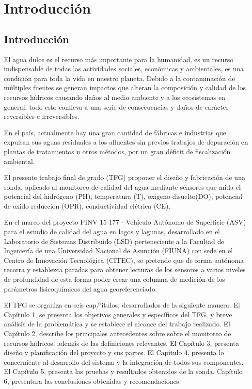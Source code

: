\chapter[Capítulo 1. Introducción]{Introducción}
\pagestyle{fancy}

\section{Introducción}

El agua dulce es el recurso más importante para la humanidad, es un recurso indispensable de todas las actividades sociales, económicas y ambientales, es una condición para toda la vida en nuestro planeta.
Debido a la contaminación de múltiples fuentes se generan impactos que alteran la composición y calidad de los recursos hídricos causando daños al medio ambiente y a los ecosistemas en general, todo esto conlleva a una serie de consecuencias y daños de carácter reversibles e irreversibles.

En el pa\'is, actualmente hay una gran cantidad de f\'abricas e industrias que expulsan sus aguas residuales a los afluentes sin previos trabajos de depuraci\'on en plantas de tratamientos u otros m\'etodos, por un gran d\'eficit de fiscalizaci\'on ambiental.

%
%
%
%

El presente trabajo final de grado (TFG) proponer el dise\~no y fabricación de una sonda, aplicado al monitoreo de calidad del agua mediante sensores que mida el potencial del hidr\'ogeno (PH), temperatura (T), oxigeno disuelto(DO), potencial de oxido reducci\'on (OPR), conductividad el\'ctrica (CE).
 
En el marco del proyecto  PINV 15-177 - Veh\'iculo Aut\'onomo de Superficie (ASV) para el estudio de calidad del agua en lagos y lagunas, desarrollado en el Laboratorio de Sistemas Distribuido (LSD) perteneciente a la Facultad de Ingenier\'ia de una Universidad Nacional de Asunci\'on (FIUNA) con sede en el Centro de Innovaci\'on Tecnol\'ogica (CITEC), se pretende que de forma aut\'onoma recorra y establezca paradas para obtener lecturas de los sensores a varios niveles de profundidad de esta forma poder crear una columna de medición de los parámetros fisicoquímicos del agua georeferenciado.

El TFG  se organiza en seis cap/'itulos, desarrollados de la siguiente manera. 
El Capítulo 1, se presenta los objetivos generales y espec\'ificos del TFG,  y breve an\'alisis de la problem\'atica y se establece el alcance del trabajo realizado.
El Capítulo 2, describe los principales antecedentes sobre sobre el monitoreo de recursos h\'idricos, adem\'as de las definiciones relevantes. 
El Capítulo 3, presenta dise\~no y planificaci\'on del proyecto y sus partes.
El Capítulo 4, presenta lo concerniente al desarrollo del sistema y la integraci\'on de todos sus componentes.   
El Capítulo 5, presenta las pruebas y resultados obtenidos de la sonda. 
Capítulo 6,  presentara las conclusiones obtenidas y recomendaciones.

